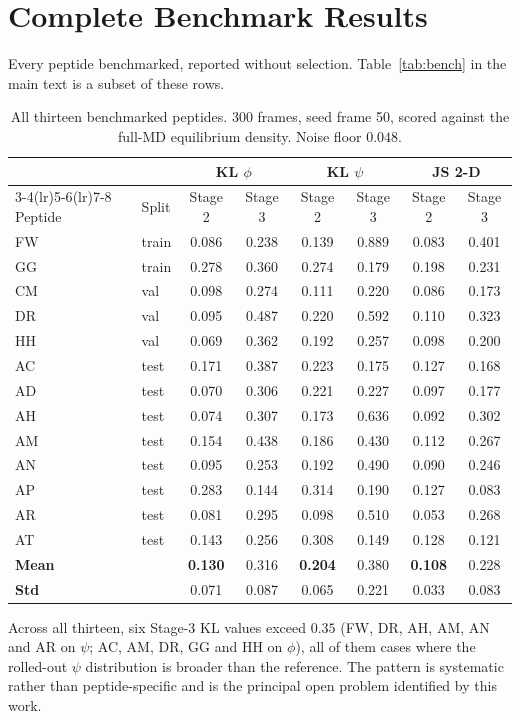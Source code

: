 \documentclass[11pt,a4paper]{article}
\begin{document}
\appendix
\section{Complete Benchmark Results}
\label{app:full}

Every peptide benchmarked, reported without selection. Table~\ref{tab:bench}
in the main text is a subset of these rows.

\begin{table}[H]
\centering
\caption{All thirteen benchmarked peptides. 300 frames, seed frame 50,
scored against the full-MD equilibrium density. Noise floor $0.048$.}
\label{tab:full}
\small
\begin{tabular}{@{}ll cc cc cc@{}}
\toprule
& & \multicolumn{2}{c}{KL $\phi$} & \multicolumn{2}{c}{KL $\psi$}
  & \multicolumn{2}{c}{JS 2-D} \\
\cmidrule(lr){3-4}\cmidrule(lr){5-6}\cmidrule(lr){7-8}
Peptide & Split & Stage 2 & Stage 3 & Stage 2 & Stage 3 & Stage 2 & Stage 3 \\
\midrule
FW & train & 0.086 & 0.238 & 0.139 & 0.889 & 0.083 & 0.401 \\
GG & train & 0.278 & 0.360 & 0.274 & 0.179 & 0.198 & 0.231 \\
CM & val   & 0.098 & 0.274 & 0.111 & 0.220 & 0.086 & 0.173 \\
DR & val   & 0.095 & 0.487 & 0.220 & 0.592 & 0.110 & 0.323 \\
HH & val   & 0.069 & 0.362 & 0.192 & 0.257 & 0.098 & 0.200 \\
AC & test  & 0.171 & 0.387 & 0.223 & 0.175 & 0.127 & 0.168 \\
AD & test  & 0.070 & 0.306 & 0.221 & 0.227 & 0.097 & 0.177 \\
AH & test  & 0.074 & 0.307 & 0.173 & 0.636 & 0.092 & 0.302 \\
AM & test  & 0.154 & 0.438 & 0.186 & 0.430 & 0.112 & 0.267 \\
AN & test  & 0.095 & 0.253 & 0.192 & 0.490 & 0.090 & 0.246 \\
AP & test  & 0.283 & 0.144 & 0.314 & 0.190 & 0.127 & 0.083 \\
AR & test  & 0.081 & 0.295 & 0.098 & 0.510 & 0.053 & 0.268 \\
AT & test  & 0.143 & 0.256 & 0.308 & 0.149 & 0.128 & 0.121 \\
\midrule
\textbf{Mean} & & \textbf{0.130} & 0.316 & \textbf{0.204} & 0.380 & \textbf{0.108} & 0.228 \\
\textbf{Std}  & & 0.071 & 0.087 & 0.065 & 0.221 & 0.033 & 0.083 \\
\bottomrule
\end{tabular}
\end{table}

Across all thirteen, six Stage-3 KL values exceed $0.35$ (FW, DR, AH, AM, AN
and AR on $\psi$; AC, AM, DR, GG and HH on $\phi$), all of them cases where the
rolled-out $\psi$ distribution is broader than the reference. The pattern is
systematic rather than peptide-specific and is the principal open problem
identified by this work.
\end{document}
